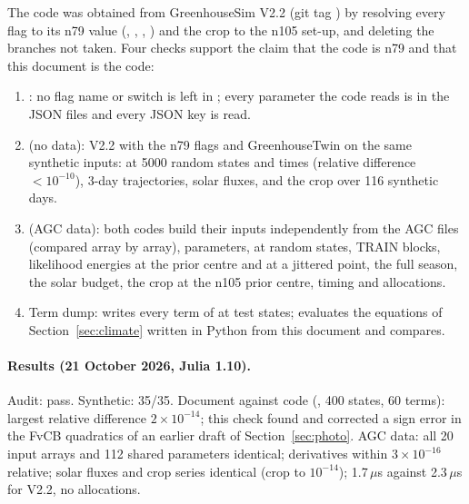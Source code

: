 The code was obtained from GreenhouseSim V2.2 (git tag ) by resolving every flag to its n79 value
(, , , ) and the crop to the n105 set-up, and deleting the
branches not taken. Four checks support the claim that the code is n79 and that this document is the code:
\begin{enumerate}[nosep]
\item {}: no flag name or  switch is left in ; every parameter the code
reads is in the JSON files and every JSON key is read.
\item {} (no data): V2.2 with the n79 flags and GreenhouseTwin on the same synthetic
inputs:  at 5000 random states and times (relative difference $<10^{-10}$), 3-day trajectories, solar fluxes, and the
crop over 116 synthetic days.
\item {} (AGC data): both codes build their inputs independently from the AGC files (compared
array by array), parameters,  at random states, TRAIN blocks, likelihood energies at the prior centre and at a
jittered point, the full season, the solar budget, the crop at the n105 prior centre, timing and allocations.
\item Term dump:  writes every term of  at test states; 
evaluates the equations of Section~\ref{sec:climate} written in Python from this document and compares.
\end{enumerate}
\paragraph{Results (21 October 2026, Julia 1.10).} Audit: pass. Synthetic: 35/35. Document against code (,
400 states, 60 terms): largest relative difference $2\times10^{-14}$; this check found and corrected a sign error in the FvCB
quadratics of an earlier draft of Section~\ref{sec:photo}. AGC data: all 20 input arrays and 112 shared parameters identical;
 derivatives within $3\times10^{-16}$ relative; solar fluxes and crop series identical (crop to $10^{-14}$);
 1.7\,$\mu$s against 2.3\,$\mu$s for V2.2, no allocations.

